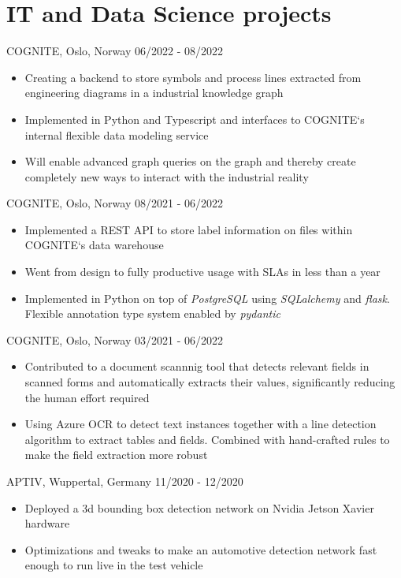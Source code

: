 \documentclass[singlesided,
               paper=a4,
               fontsize=10pt
              ]{my-resume}
\begin{document}
\section[\faGears]{IT and Data Science projects}
	{COGNITE, Oslo, Norway}
	{06/2022 - 08/2022}
	{\begin{itemize}
		\item Creating a backend to store symbols and process lines extracted from engineering diagrams in a industrial knowledge graph
		\item Implemented in Python and Typescript and interfaces to COGNITE`s internal flexible data modeling service
		\item Will enable advanced graph queries on the graph and thereby create completely new ways to interact with the industrial reality
	\end{itemize}}
%
	{COGNITE, Oslo, Norway}
	{08/2021 - 06/2022}
	{\begin{itemize}
		\item Implemented a REST API to store label information on files within COGNITE`s data warehouse
		\item Went from design to fully productive usage with SLAs in less than a year
		\item Implemented in Python on top of \textit{PostgreSQL} using \textit{SQLalchemy} and \textit{flask}. Flexible annotation type system enabled by \textit{pydantic}
	\end{itemize}}
%
	{COGNITE, Oslo, Norway}
	{03/2021 - 06/2022}
	{\begin{itemize}
		\item Contributed to a document scannnig tool that detects relevant fields in scanned forms and automatically extracts their values, significantly reducing the human effort required
		\item Using Azure OCR to detect text instances together with a line detection algorithm to extract tables and fields. Combined with hand-crafted rules to make the field extraction more robust
	\end{itemize}}	
%
    {APTIV, Wuppertal, Germany}
    {11/2020 - 12/2020}
    {\begin{itemize}[leftmargin=2em]
        \item Deployed a 3d bounding box detection network on Nvidia Jetson Xavier hardware 
        \item Optimizations and tweaks to make an automotive detection network fast enough to run live in the test vehicle
    \end{itemize}}
\end{document}
